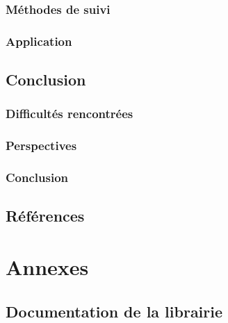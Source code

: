 \documentclass{report}
\begin{document}
		\section{Méthodes de suivi}
		\section{Application}
	
	\chapter{Conclusion}
		\section{Difficultés rencontrées}
		\section{Perspectives}
		\section{Conclusion}
	
	\chapter{Références}
	
	\part{Annexes}
	\appendix
		\chapter{Documentation de la librairie}	
\end{document}
